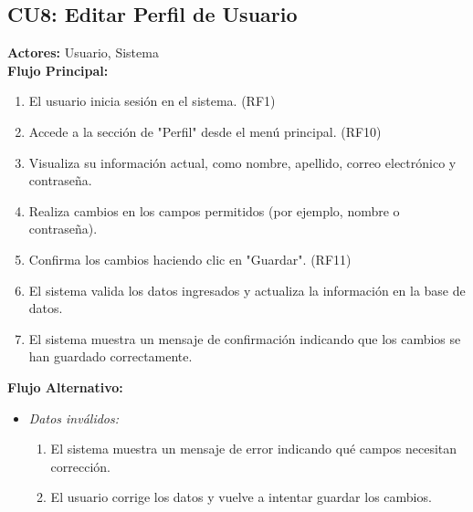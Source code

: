 \subsection*{CU8: Editar Perfil de Usuario}
\textbf{Actores:} Usuario, Sistema\\
\textbf{Flujo Principal:}
\begin{enumerate}
    \item El usuario inicia sesión en el sistema. (RF1)
    \item Accede a la sección de "Perfil" desde el menú principal. (RF10)
    \item Visualiza su información actual, como nombre, apellido, correo electrónico y contraseña.
    \item Realiza cambios en los campos permitidos (por ejemplo, nombre o contraseña).
    \item Confirma los cambios haciendo clic en "Guardar". (RF11)
    \item El sistema valida los datos ingresados y actualiza la información en la base de datos.
    \item El sistema muestra un mensaje de confirmación indicando que los cambios se han guardado correctamente.
\end{enumerate}
\textbf{Flujo Alternativo:}
\begin{itemize}
    \item \textit{Datos inválidos:}
    \begin{enumerate}
        \item El sistema muestra un mensaje de error indicando qué campos necesitan corrección.
        \item El usuario corrige los datos y vuelve a intentar guardar los cambios.
    \end{enumerate}
\end{itemize}